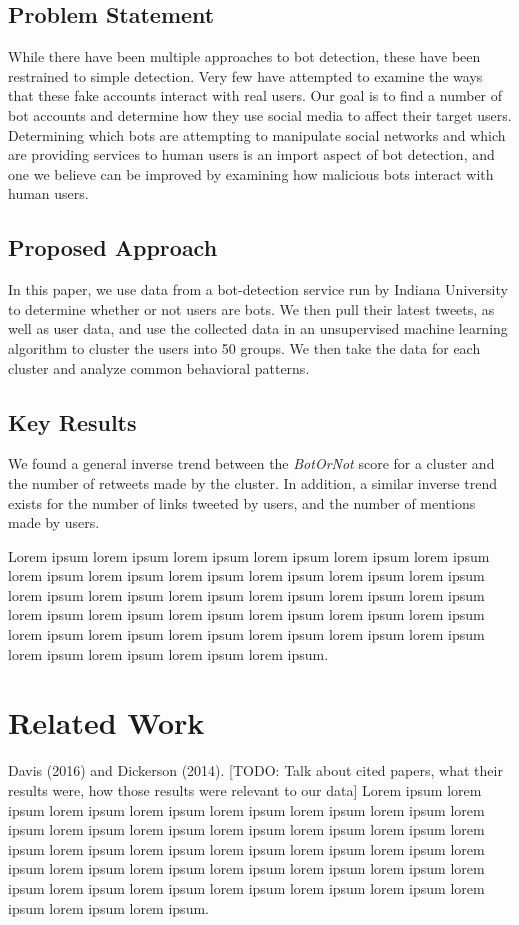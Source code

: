 \documentclass{sig-alternate-05-2015}
\begin{document}
\subsection{Problem Statement}
While there have been multiple approaches to bot detection\cite{Stringhini:DetectSpam}\cite{Xiao:ClusterFakeAccounts}\cite{Chu:DetectAutomation}, these have been restrained to simple detection. Very few have attempted to examine the ways that these fake accounts interact with real users. Our goal is to find a number of bot accounts and determine how they use social media to affect their target users. Determining which bots are attempting to manipulate social networks and which are providing services to human users is an import aspect of bot detection, and one we believe can be improved by examining how malicious bots interact with human users.

\subsection{Proposed Approach}
In this paper, we use data from a bot-detection service run by Indiana University to determine whether or not users are bots. We then pull their latest tweets, as well as user data, and use the collected data in an unsupervised machine learning algorithm to cluster the users into 50 groups. We then take the data for each cluster and analyze common behavioral patterns.

\subsection{Key Results}
We found a general inverse trend between the \emph{BotOrNot} score for a cluster and the number of retweets made by the cluster. In addition, a similar inverse trend exists for the number of links tweeted by users, and the number of mentions made by users.

Lorem ipsum lorem ipsum lorem ipsum lorem ipsum lorem ipsum lorem ipsum lorem ipsum lorem ipsum lorem ipsum lorem ipsum lorem ipsum lorem ipsum lorem ipsum lorem ipsum lorem ipsum lorem ipsum lorem ipsum lorem ipsum lorem ipsum lorem ipsum lorem ipsum lorem ipsum lorem ipsum lorem ipsum lorem ipsum lorem ipsum lorem ipsum lorem ipsum lorem ipsum lorem ipsum lorem ipsum lorem ipsum lorem ipsum lorem ipsum.

\section{Related Work}
Davis (2016)\cite{Davis:BotOrNot} and Dickerson (2014)\cite{Dickerson:Sentiment}. [TODO: Talk about cited papers, what their results were, how those results were relevant to our data] Lorem ipsum lorem ipsum lorem ipsum lorem ipsum lorem ipsum lorem ipsum lorem ipsum lorem ipsum lorem ipsum lorem ipsum lorem ipsum lorem ipsum lorem ipsum lorem ipsum lorem ipsum lorem ipsum lorem ipsum lorem ipsum lorem ipsum lorem ipsum lorem ipsum lorem ipsum lorem ipsum lorem ipsum lorem ipsum lorem ipsum lorem ipsum lorem ipsum lorem ipsum lorem ipsum lorem ipsum lorem ipsum lorem ipsum lorem ipsum.
\end{document}
